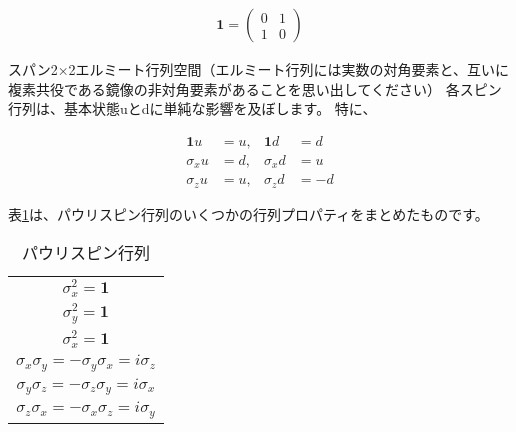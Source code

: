 \begin{align}
\mathbf{1} = 
\left( \begin{array}{ccc}
 0 & 1 \\
 1 & 0
\end{array} \right) 
\end{align}

スパン2×2エルミート行列空間（エルミート行列には実数の対角要素と、互いに複素共役である鏡像の非対角要素があることを思い出してください）
各スピン行列は、基本状態uとdに単純な影響を及ぼします。 特に、

\begin{align}
  \mathbf{1} u &= u, &\mathbf{1} d &= d \\
  \sigma_x u &= d, &\sigma_x d &= u \\
  \sigma_z u &= u, &\sigma_z d &= - d
\end{align}
 
表\ref{tab:t1}は、パウリスピン行列のいくつかの行列プロパティをまとめたものです。

\begin{table}[H]
\label{tab:t1}
\caption{パウリスピン行列}
\centering
\begin{tabular}{|c|} \hline
$\sigma_x^2 = \mathbf{1} $ \\ 
$\sigma_y^2 = \mathbf{1} $ \\
$\sigma_x^2 = \mathbf{1} $\\
$\sigma_x \sigma_y = - \sigma_y \sigma_x = i \sigma_z$ \\
$\sigma_y \sigma_z = - \sigma_z \sigma_y = i \sigma_x$ \\
$\sigma_z \sigma_x = - \sigma_x \sigma_z = i \sigma_y$ \\ \hline
\end{tabular}
\end{table}



